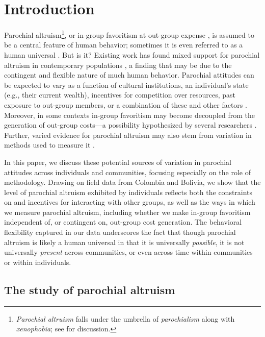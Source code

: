 \documentclass[bibauthoryear]{aa}
\begin{document}

\linenumbers
\section{Introduction}\label{firstbit}
Parochial altruism\footnote{\emph{Parochial altruism} falls under the umbrella of \emph{parochialism} along with \emph{xenophobia}; see \citet{hruschka2013economic} for discussion.}, or in-group favoritism at out-group expense \citep{choi2007coevolution}, is assumed to be a central feature of human behavior; sometimes it is even referred to as a human universal \citep{greene2013moral}. But is it? Existing work has found mixed support for parochial altruism in contemporary populations \citep{Rusch2014}, a finding that may be due to the contingent and flexible nature of much human behavior. Parochial attitudes can be expected to vary as a function of cultural institutions, an individual's state (e.g., their current wealth), incentives for competition over resources,  past exposure to out-group members, or a combination of these and other factors \citep{pisor2019evolution}. Moreover, in some contexts in-group favoritism may become decoupled from the generation of out-group costs---a possibility hypothesized by several researchers \citep{purzycki2019identity, hruschka2013economic, yamagishi2016parochial, brewer2006evolutionary, schaub2017threat, cashdan2001ethnocentrism}. Further, varied evidence for parochial altruism may also stem from variation in methods used to measure it \citep{Pisor2020}.


In this paper, we discuss these potential sources of variation in parochial attitudes across individuals and communities, focusing especially on the role of methodology. Drawing on field data from Colombia and Bolivia, we show that the level of  parochial altruism  exhibited by individuals reflects both the constraints on and incentives for interacting with other groups, as well as the ways in which we measure parochial altruism, including whether we make in-group favoritism independent of, or contingent on, out-group cost generation. The behavioral flexibility captured in our data underscores the fact that though parochial altruism is likely a human universal in that it is universally \textit{possible}, it is not universally \textit{present} across communities, or even across time within communities or within individuals.


\subsection{The study of parochial altruism}\label{onepointone}
\end{document}
